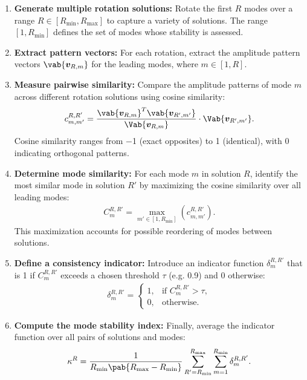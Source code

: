 \begin{enumerate}
    \item \textbf{Generate multiple rotation solutions:} Rotate the first $R$ modes over a range $R\in[R_{\text{min}}, R_{\text{max}}]$ to capture a variety of solutions. The range $[1, R_{\text{min}}]$ defines the set of modes whose stability is assessed.
    \item \textbf{Extract pattern vectors:} For each rotation, extract the amplitude pattern vectors $\vab{\bm{v}_{R, m}}$ for the leading modes, where $m\in[1, R]$. 
    \item \textbf{Measure pairwise similarity:} Compare the amplitude patterns of mode $m$ across different rotation solutions using cosine similarity: 
    \begin{align}
        c_{m, m'}^{R, R'} = \frac{\vab{\bm{v}_{R,m}}^T \vab{\bm{v}_{R',m'}}}{\Vab{\bm{v}_{R,m}}} \cdot \Vab{\bm{v}_{R',m'}}.
    \end{align}
    Cosine similarity ranges from \num{-1} (exact opposites) to \num{1} (identical), with \num{0} indicating orthogonal patterns. 
    \item \textbf{Determine mode similarity:} For each mode $m$ in solution $R$, identify the most similar mode in solution $R'$ by maximizing the cosine similarity over all leading modes:
    \begin{align}
        C_{m}^{R, R'} = \max_{m'\in [1, R_{\text{min}}]} \left( c_{m, m'}^{R, R'} \right).
    \end{align}
    This maximization accounts for possible reordering of modes between solutions. 
    \item \textbf{Define a consistency indicator:} Introduce an indicator function $\delta_{m}^{R, R'}$ that is 1 if $C_{m}^{R, R'}$ exceeds a chosen threshold $\tau$ (e.g. \num{0.9}) and 0 otherwise: \begin{align} 
        \delta_{m}^{R, R'} = \begin{cases} 
            1, & \text{if } C_{m}^{R, R'} > \tau,\\[1mm]
            0, & \text{otherwise}.
        \end{cases}
    \end{align} 
    \item \textbf{Compute the mode stability index:} Finally, average the indicator function over all pairs of solutions and modes: 
    \begin{align}\label{eq:theory:mode_stability_index}
        \kappa^R = \frac{1}{R_{\text{min}} \pab{R_{\text{max}} - R_{\text{min}}}} \sum_{R'=R_{\text{min}}}^{R_{\text{max}}} \sum_{m=1}^{R_{\text{min}}} \delta_{m}^{R, R'}.
    \end{align}
\end{enumerate}

